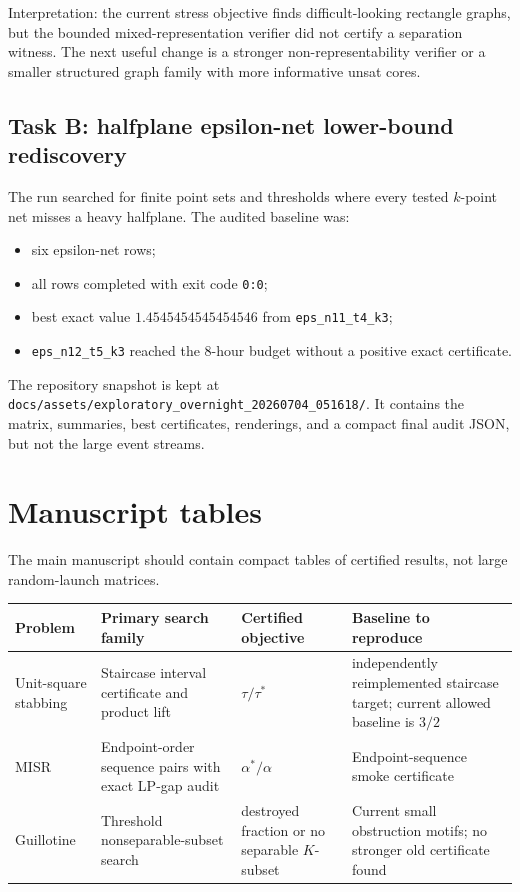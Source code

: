 \documentclass[11pt]{article}
\begin{document}
Interpretation: the current stress objective finds difficult-looking
rectangle graphs, but the bounded mixed-representation verifier did not certify
a separation witness.  The next useful change is a stronger
non-representability verifier or a smaller structured graph family with more
informative unsat cores.

\subsection{Task B: halfplane epsilon-net lower-bound rediscovery}

The run searched for finite point sets and thresholds where every tested
$k$-point net misses a heavy halfplane.  The audited baseline was:
\begin{itemize}
\item six epsilon-net rows;
\item all rows completed with exit code \texttt{0:0};
\item best exact value $1.4545454545454546$ from
\texttt{eps\_n11\_t4\_k3};
\item \texttt{eps\_n12\_t5\_k3} reached the 8-hour budget without a positive
exact certificate.
\end{itemize}

The repository snapshot is kept at
\texttt{docs/assets/exploratory\_overnight\_20260704\_051618/}.  It contains
the matrix, summaries, best certificates, renderings, and a compact final
audit JSON, but not the large event streams.

\section{Manuscript tables}

The main manuscript should contain compact tables of certified results, not
large random-launch matrices.

\begin{center}
\begin{tabularx}{\textwidth}{p{}p{}p{}X}
\toprule
Problem & Primary search family & Certified objective & Baseline to reproduce \\
\midrule
Unit-square stabbing & Staircase interval certificate and product lift & $\tau/\tau^*$ & independently reimplemented staircase target; current allowed baseline is $3/2$ \\
MISR & Endpoint-order sequence pairs with exact LP-gap audit & $\alpha^*/\alpha$ & Endpoint-sequence smoke certificate \\
Guillotine & Threshold nonseparable-subset search & destroyed fraction or no separable $K$-subset & Current small obstruction motifs; no stronger old certificate found \\
\bottomrule
\end{tabularx}
\end{center}
\end{document}

